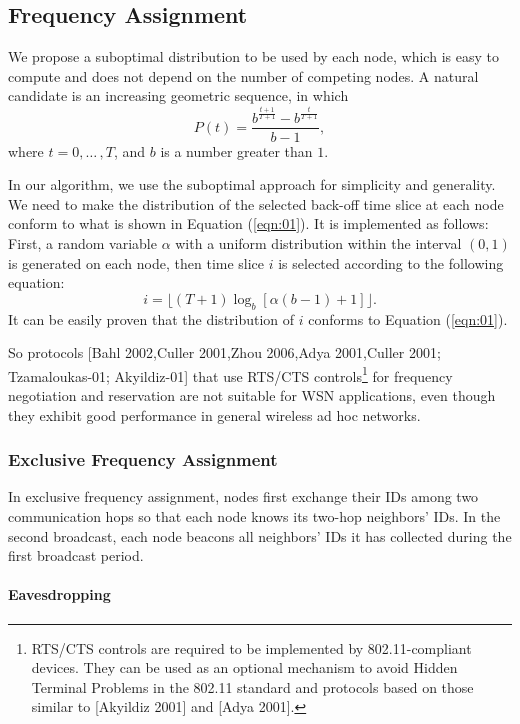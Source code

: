 \subsection{Frequency Assignment}

We propose a suboptimal distribution to be used by each node, which is
easy to compute and does not depend on the number of competing
nodes. A natural candidate is an increasing geometric sequence, in
which
\begin{equation}
  \label{eqn:01}
  P(t)=\frac{b^{\frac{t+1}{T+1}}-b^{\frac{t}{T+1}}}{b-1},
\end{equation}
where $t=0,{\ldots}\,,T$, and $b$ is a number greater than $1$.

In our algorithm, we use the suboptimal approach for simplicity and
generality. We need to make the distribution of the selected back-off
time slice at each node conform to what is shown in Equation
(\ref{eqn:01}). It is implemented as follows: First, a random
variable $\alpha$ with a uniform distribution within the interval
$(0, 1)$ is generated on each node, then time slice $i$ is selected
according to the following equation:
\[
  i=\lfloor(T+1)\log_b[\alpha(b-1)+1]\rfloor.
\]
It can be easily proven that the distribution of $i$ conforms to Equation
(\ref{eqn:01}).

So protocols [Bahl 2002,Culler 2001,Zhou 2006,Adya 2001,Culler 2001;
Tzamaloukas-01; Akyildiz-01] that use RTS/CTS
controls\footnote{RTS/CTS controls are required to be implemented by
802.11-compliant devices. They can be used as an optional mechanism
to avoid Hidden Terminal Problems in the 802.11 standard and
protocols based on those similar to [Akyildiz 2001] and
[Adya 2001].} for frequency negotiation and reservation are not
suitable for WSN applications, even though they exhibit good
performance in general wireless ad hoc
networks.

\subsubsection{Exclusive Frequency Assignment}

In exclusive frequency assignment, nodes first exchange their IDs
among two communication hops so that each node knows its two-hop
neighbors' IDs. In the second broadcast, each node beacons all
neighbors' IDs it has collected during the first broadcast period.

\paragraph{Eavesdropping}

